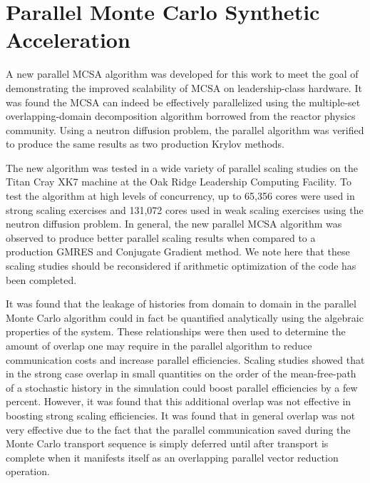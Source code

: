 \section{Parallel Monte Carlo Synthetic Acceleration\ }
\label{sec:parallel_mc_conclusions}

A new parallel MCSA algorithm was developed for this work to meet the
goal of demonstrating the improved scalability of MCSA on
leadership-class hardware. It was found the MCSA can indeed be
effectively parallelized using the multiple-set overlapping-domain
decomposition algorithm borrowed from the reactor physics
community. Using a neutron diffusion problem, the parallel algorithm
was verified to produce the same results as two production Krylov
methods.

The new algorithm was tested in a wide variety of parallel scaling
studies on the Titan Cray XK7 machine at the Oak Ridge Leadership
Computing Facility. To test the algorithm at high levels of
concurrency, up to 65,356 cores were used in strong scaling exercises
and 131,072 cores used in weak scaling exercises using the neutron
diffusion problem. In general, the new parallel MCSA algorithm was
observed to produce better parallel scaling results when compared to a
production GMRES and Conjugate Gradient method. We note here that
these scaling studies should be reconsidered if arithmetic
optimization of the code has been completed.

It was found that the leakage of histories from domain to domain in
the parallel Monte Carlo algorithm could in fact be quantified
analytically using the algebraic properties of the system. These
relationships were then used to determine the amount of overlap one
may require in the parallel algorithm to reduce communication costs
and increase parallel efficiencies. Scaling studies showed that in the
strong case overlap in small quantities on the order of the
mean-free-path of a stochastic history in the simulation could boost
parallel efficiencies by a few percent. However, it was found that
this additional overlap was not effective in boosting strong scaling
efficiencies. It was found that in general overlap was not very
effective due to the fact that the parallel communication saved during
the Monte Carlo transport sequence is simply deferred until after
transport is complete when it manifests itself as an overlapping
parallel vector reduction operation.

